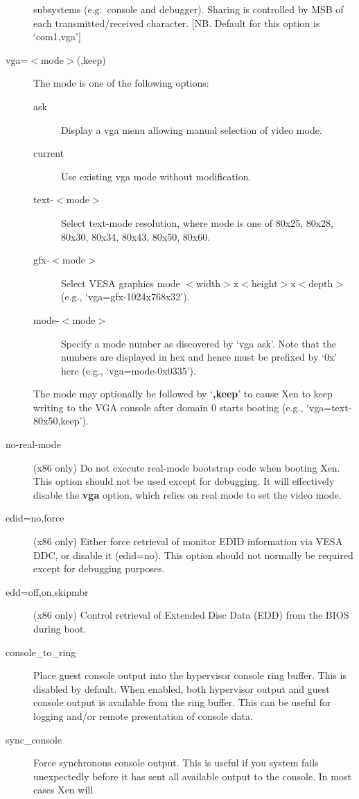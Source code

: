 \documentclass[11pt,twoside,final,openright]{report}
\begin{document}
\begin{description}
  subsystems (e.g.\ console and debugger). Sharing is controlled by
  MSB of each transmitted/received character.  [NB. Default for this
  option is `com1,vga']
\item [ vga=$<$mode$>$(,keep) ] The mode is one of the following options:
  \begin{description}
  \item[ ask ] Display a vga menu allowing manual selection of video
  mode.
  \item[ current ] Use existing vga mode without modification.
  \item[ text-$<$mode$>$ ] Select text-mode resolution, where mode is
  one of 80x25, 80x28, 80x30, 80x34, 80x43, 80x50, 80x60.
  \item[ gfx-$<$mode$>$ ] Select VESA graphics mode
  $<$width$>$x$<$height$>$x$<$depth$>$ (e.g., `vga=gfx-1024x768x32').
  \item[ mode-$<$mode$>$ ] Specify a mode number as discovered by `vga
  ask'. Note that the numbers are displayed in hex and hence must be
  prefixed by `0x' here (e.g., `vga=mode-0x0335').
  \end{description}
The mode may optionally be followed by `{\bf,keep}' to cause Xen to keep
writing to the VGA console after domain 0 starts booting (e.g., `vga=text-80x50,keep').
\item [ no-real-mode ] (x86 only) Do not execute real-mode bootstrap
  code when booting Xen. This option should not be used except for
  debugging. It will effectively disable the {\bf vga} option, which
  relies on real mode to set the video mode.
\item [ edid=no,force ] (x86 only) Either force retrieval of monitor
  EDID information via VESA DDC, or disable it (edid=no). This option
  should not normally be required except for debugging purposes.
\item [ edd=off,on,skipmbr ] (x86 only) Control retrieval of Extended
  Disc Data (EDD) from the BIOS during boot.
\item [ console\_to\_ring ] Place guest console output into the
  hypervisor console ring buffer. This is disabled by default.
  When enabled, both hypervisor output and guest console output
  is available from the ring buffer. This can be useful for logging
  and/or remote presentation of console data.
\item [ sync\_console ] Force synchronous console output. This is
  useful if you system fails unexpectedly before it has sent all
  available output to the console. In most cases Xen will

\end{description}
\end{document}

